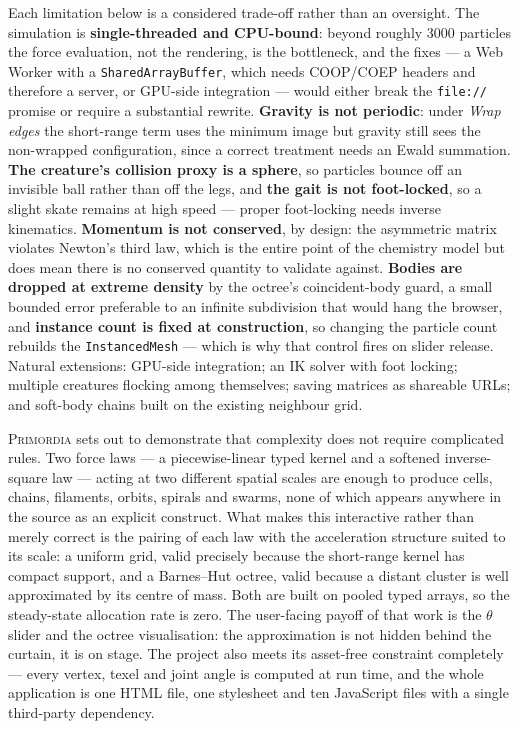 \documentclass[10pt,a4paper]{article}
\newcommand{\code}[1]{\texttt{\small #1}}
\begin{document}
Each limitation below is a considered trade-off rather than an oversight. The simulation is
\textbf{single-threaded and CPU-bound}: beyond roughly 3000 particles the force evaluation, not the
rendering, is the bottleneck, and the fixes --- a Web Worker with a \code{SharedArrayBuffer}, which needs
COOP/COEP headers and therefore a server, or GPU-side integration --- would either break the \code{file://}
promise or require a substantial rewrite. \textbf{Gravity is not periodic}: under \emph{Wrap edges} the
short-range term uses the minimum image but gravity still sees the non-wrapped configuration, since a
correct treatment needs an Ewald summation. \textbf{The creature's collision proxy is a sphere}, so
particles bounce off an invisible ball rather than off the legs, and \textbf{the gait is not foot-locked},
so a slight skate remains at high speed --- proper foot-locking needs inverse kinematics.
\textbf{Momentum is not conserved}, by design: the asymmetric matrix violates Newton's third law, which is
the entire point of the chemistry model but does mean there is no conserved quantity to validate against.
\textbf{Bodies are dropped at extreme density} by the octree's coincident-body guard, a small bounded error
preferable to an infinite subdivision that would hang the browser, and \textbf{instance count is fixed at
construction}, so changing the particle count rebuilds the \code{InstancedMesh} --- which is why that
control fires on slider release. Natural extensions: GPU-side integration; an IK solver with foot locking;
multiple creatures flocking among themselves; saving matrices as shareable URLs; and soft-body chains built
on the existing neighbour grid.

\medskip
\noindent \textsc{Primordia} sets out to demonstrate that complexity does not require complicated rules.
Two force laws --- a piecewise-linear typed kernel and a softened inverse-square law --- acting at two
different spatial scales are enough to produce cells, chains, filaments, orbits, spirals and swarms, none of
which appears anywhere in the source as an explicit construct. What makes this interactive rather than
merely correct is the pairing of each law with the acceleration structure suited to its scale: a uniform
grid, valid precisely because the short-range kernel has compact support, and a Barnes--Hut octree, valid
because a distant cluster is well approximated by its centre of mass. Both are built on pooled typed arrays,
so the steady-state allocation rate is zero. The user-facing payoff of that work is the $\theta$ slider and
the octree visualisation: the approximation is not hidden behind the curtain, it is on stage. The project
also meets its asset-free constraint completely --- every vertex, texel and joint angle is computed at run
time, and the whole application is one HTML file, one stylesheet and ten JavaScript files with a single
third-party dependency.
\end{document}
